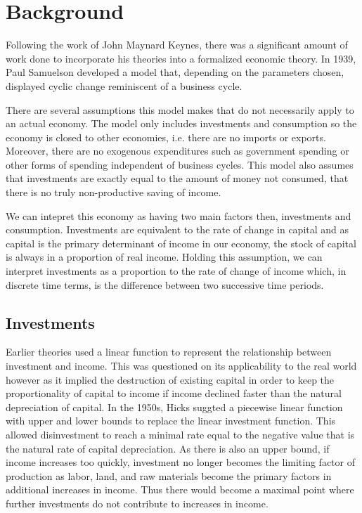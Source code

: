 \documentclass[]{article}
\begin{document}
	\section*{Background}
  Following the work of John Maynard Keynes, there was a significant amount of work done to incorporate his theories into a formalized economic theory. In 1939, Paul Samuelson developed a model that, depending on the parameters chosen, displayed cyclic change reminiscent of a business cycle\autocite{Puu2003,Skousen1997}.

	There are several assumptions this model makes that do not necessarily apply to an actual economy. The model only includes investments and consumption so the economy is closed to other economies, i.e. there are no imports or exports. Moreover, there are no exogenous expenditures such as government spending or other forms of spending independent of business cycles. This model also assumes that investments are exactly equal to the amount of money not consumed, that there is no truly non-productive saving of income.

	We can intepret this economy as having two main factors then, investments and consumption. Investments are equivalent to the rate of change in capital and as capital is the primary determinant of income in our economy, the stock of capital is always in a proportion of real income. Holding this assumption, we can interpret investments as a proportion to the rate of change of income which, in discrete time terms, is the difference between two successive time periods.

	\subsection*{Investments}
	Earlier theories used a linear function to represent the relationship between investment and income. This was questioned on its applicability to the real world however as it implied the destruction of existing capital in order to keep the proportionality of capital to income if income declined faster than the natural depreciation of capital. In the 1950s, Hicks suggted a piecewise linear function with upper and lower bounds to replace the linear investment function\autocite{Puu2003}. This allowed disinvestment to reach a minimal rate equal to the negative value that is the natural rate of capital depreciation. As there is also an upper bound, if income increases too quickly, investment no longer becomes the limiting factor of production as labor, land, and raw materials become the primary factors in additional increases in income. Thus there would become a maximal point where further investments do not contribute to increases in income.
\end{document}
